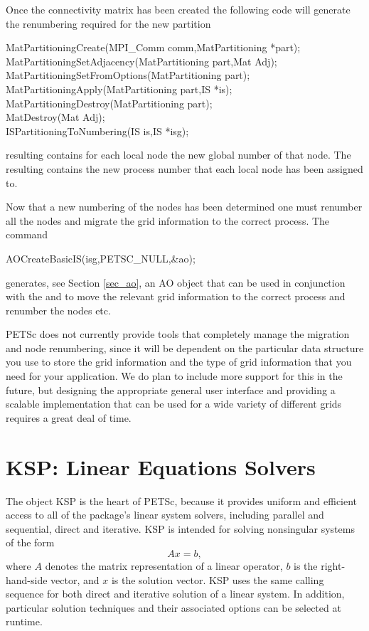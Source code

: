 Once the connectivity matrix has been created the following code will generate the 
renumbering required for the new partition
\begin{tabbing}
 MatPartitioningCreate(MPI\_Comm comm,MatPartitioning *part);\\
 MatPartitioningSetAdjacency(MatPartitioning part,Mat Adj);\\
 MatPartitioningSetFromOptions(MatPartitioning part);\\
 MatPartitioningApply(MatPartitioning part,IS *is);\\
 MatPartitioningDestroy(MatPartitioning part); \\
 MatDestroy(Mat Adj);\\
 ISPartitioningToNumbering(IS is,IS *isg);
\end{tabbing}
resulting  contains for each local node the new global
number of that node. The resulting  contains the new process number
that each local node has been assigned to.

Now that a new numbering of the nodes has been determined one must 
renumber all the nodes and migrate the grid information to the correct process.
The command
\begin{tabbing}
 AOCreateBasicIS(isg,PETSC_NULL,\&ao);
\end{tabbing}
generates, see Section \ref{sec_ao}, an AO object that can be used in conjunction with the
 and  to move the relevant grid information to the correct process
and renumber the nodes etc. 

PETSc does not currently provide tools that completely manage the migration and 
node renumbering, since it will be dependent on the particular data structure you 
use to store the grid information and the type of grid information that you need
for your application. We do plan to include more support for this in the future,
but designing the appropriate general user interface and providing a scalable
implementation that can be used for a wide variety of different grids requires a
great deal of time.

 


\cleardoublepage
\chapter{KSP: Linear Equations Solvers} 
\label{ch_ksp}

The object KSP is the heart of PETSc, because it provides uniform and efficient access 
to all of the package's linear system solvers, including parallel and sequential,
direct and iterative.
KSP is intended for solving nonsingular systems of the form
\begin{equation}
   A x = b,
\label{eq_Ax=b}
\end{equation}
where $ A$ denotes the matrix representation of a linear operator, $b$
is the right-hand-side vector, and $ x $ is the solution vector.  KSP
uses the same calling sequence for both direct and iterative solution
of a linear system.  In addition, particular solution techniques and
their associated options can be selected at runtime.

